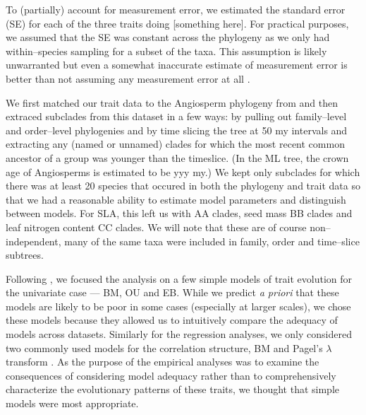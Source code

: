 \documentclass[a4paper,12pt]{article}
\begin{document}
To (partially) account for measurement error, we estimated the standard error (SE) for each of the three traits doing [something here]. For practical purposes, we assumed that the SE was constant across the phylogeny as we only had within--species sampling for a subset of the taxa. This assumption is likely unwarranted but even a somewhat inaccurate estimate of measurement error is better than not assuming any measurement error at all \citep{Hansen2012}.

We first matched our trait data to the Angiosperm phylogeny from \citet{Zanne2013} and then extraced subclades from this dataset in a few ways: by pulling out family--level and order--level phylogenies and by time slicing the tree at 50 my intervals and extracting any (named or unnamed) clades for which the most recent common ancestor of a group was younger than the timeslice. (In the ML tree, the crown age of Angiosperms is estimated to be yyy my.) We kept only subclades for which there was at least 20 species that occured in both the phylogeny and trait data so that we had a reasonable ability to estimate model parameters and distinguish between models. For SLA, this left us with AA clades, seed mass BB clades and leaf nitrogen content CC clades. We will note that these are of course non--independent, many of the same taxa were included in family, order and time--slice subtrees. 

Following \citet{Harmon2010}, we focused the analysis on a few simple models of trait evolution for the univariate case --- BM, OU and EB. While we predict \textit{a priori} that these models are likely to be poor in some cases (especially at larger scales), we chose these models because they allowed us to intuitively compare the adequacy of models across datasets. Similarly for the regression analyses, we only considered two commonly used models for the correlation structure, BM and Pagel's $\lambda$ transform \citep{Pagel1999, Freckleton2002} \citep[also see][]{Revell2010, Freckleton2011}. As the purpose of the empirical analyses was to examine the consequences of considering model adequacy rather than to comprehensively characterize the evolutionary patterns of these traits, we thought that simple models were most appropriate.
\end{document}
